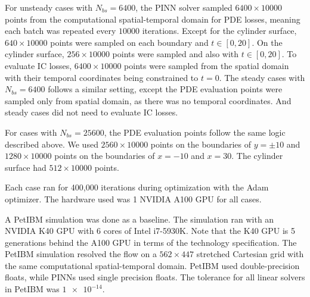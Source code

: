For unsteady cases with $N_{bs}=\num{6400}$, the PINN solver sampled $\num{6400}\times \num{10000}$ points from the computational spatial-temporal domain for PDE losses, meaning each batch was repeated every $\num{10000}$ iterations.
Except for the cylinder surface, $640\times \num{10000}$ points were sampled on each boundary and $t\in[0, 20]$.
On the cylinder surface, $256\times \num{10000}$ points were sampled and also with $t\in[0, 20]$.
To evaluate IC losses, $\num{6400}\times \num{10000}$ points were sampled from the spatial domain with their temporal coordinates being constrained to $t=0$.
The steady cases with $N_{bs}=\num{6400}$ follows a similar setting, except the PDE evaluation points were sampled only from spatial domain, as there was no temporal coordinates.
And steady cases did not need to evaluate IC losses.

For cases with $N_{bs}=\num{25600}$, the PDE evaluation points follow the same logic described above.
We used $\num{2560}\times \num{10000}$ points on the boundaries of $y=\pm 10$ and $\num{1280}\times \num{10000}$ points on the boundaries of $x=-10$ and $x=30$.
The cylinder surface had $512\times \num{10000}$ points.

Each case ran for 400,000 iterations during optimization with the Adam optimizer.
The hardware used was 1 NVIDIA A100 GPU for all cases.

A PetIBM simulation was done as a baseline.
The simulation ran with an NVIDIA K40 GPU with 6 cores of Intel i7-5930K.
Note that the K40 GPU is 5 generations behind the A100 GPU in terms of the technology specification.
The PetIBM simulation resolved the flow on a $562 \times 447$ stretched Cartesian grid with the same computational spatial-temporal domain.
PetIBM used double-precision floats, while PINNs used single precision floats.
The tolerance for all linear solvers in PetIBM was $\num{1e-14}$.
